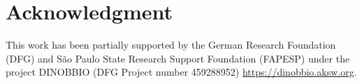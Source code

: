 \documentclass[
]{ceurart}
\begin{document}
\section*{Acknowledgment}

This work has been partially supported by the German Research Foundation (DFG) and São Paulo State Research Support Foundation (FAPESP) under the project DINOBBIO (DFG Project number 459288952) \url{https://dinobbio.aksw.org}.


\end{document}
